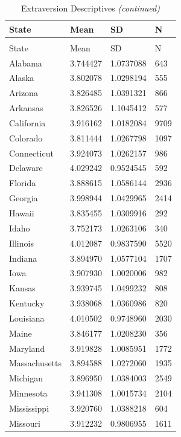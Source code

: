 \documentclass[
  english,
  man]{apa6}
\begin{document}
\begin{landscape}
\begin{longtable}[t]{llll}
\caption{\label{tab:KableOuput}Extraversion Descriptives}\\
\toprule
State & Mean & SD & N\\
\midrule
\endfirsthead
\caption[]{\label{tab:KableOuput}Extraversion Descriptives \textit{(continued)}}\\
\toprule
State & Mean & SD & N\\
\midrule
\endhead

\endfoot
\bottomrule
\endlastfoot
Alabama & 3.744427 & 1.0737088 & 643\\
Alaska & 3.802078 & 1.0298194 & 555\\
Arizona & 3.826485 & 1.0391321 & 866\\
Arkansas & 3.826526 & 1.1045412 & 577\\
California & 3.916162 & 1.0182084 & 9709\\
\addlinespace
Colorado & 3.811444 & 1.0267798 & 1097\\
Connecticut & 3.924073 & 1.0262157 & 986\\
Delaware & 4.029242 & 0.9524545 & 592\\
Florida & 3.888615 & 1.0586144 & 2936\\
Georgia & 3.998944 & 1.0429965 & 2414\\
\addlinespace
Hawaii & 3.835455 & 1.0309916 & 292\\
Idaho & 3.752173 & 1.0263106 & 340\\
Illinois & 4.012087 & 0.9837590 & 5520\\
Indiana & 3.894970 & 1.0577104 & 1707\\
Iowa & 3.907930 & 1.0020006 & 982\\
\addlinespace
Kansas & 3.939745 & 1.0499232 & 808\\
Kentucky & 3.938068 & 1.0360986 & 820\\
Louisiana & 4.010502 & 0.9748960 & 2030\\
Maine & 3.846177 & 1.0208230 & 356\\
Maryland & 3.919828 & 1.0085951 & 1772\\
\addlinespace
Massachusetts & 3.894588 & 1.0272060 & 1935\\
Michigan & 3.896950 & 1.0384003 & 2549\\
Minnesota & 3.941308 & 1.0015734 & 2104\\
Mississippi & 3.920760 & 1.0388218 & 604\\
Missouri & 3.912232 & 0.9806955 & 1611\\

\end{longtable}
\end{landscape}
\end{document}
